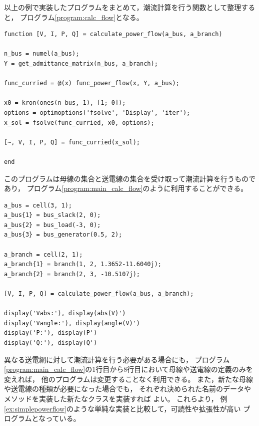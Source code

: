 \documentclass[tombow,dvipdfmx]{corona-a5-1.1}
\begin{document}
\begin{例}[潮流計算の実装結果]

以上の例で実装したプログラムをまとめて，潮流計算を行う関数として整理すると，
プログラム\nobreak\ref{program:calc_flow}となる。

\smallskip
\begin{PROGRAMA}[count,title={calculate\_power\_flow.m}]\label{program:calc_flow}
\begin{verbatim}
function [V, I, P, Q] = calculate_power_flow(a_bus, a_branch)

n_bus = numel(a_bus);
Y = get_admittance_matrix(n_bus, a_branch);

func_curried = @(x) func_power_flow(x, Y, a_bus);

x0 = kron(ones(n_bus, 1), [1; 0]);
options = optimoptions('fsolve', 'Display', 'iter');
x_sol = fsolve(func_curried, x0, options);

[~, V, I, P, Q] = func_curried(x_sol);

end
\end{verbatim}
\end{PROGRAMA}

このプログラムは母線の集合と送電線の集合を受け取って潮流計算を行うものであり，
プログラム\nobreak\ref{program:main_calc_flow}のように利用することができる。

\smallskip
\begin{PROGRAMA}[count,title={main\_power\_flow.m}]\label{program:main_calc_flow}
\begin{verbatim}
a_bus = cell(3, 1);
a_bus{1} = bus_slack(2, 0);
a_bus{2} = bus_load(-3, 0);
a_bus{3} = bus_generator(0.5, 2);

a_branch = cell(2, 1);
a_branch{1} = branch(1, 2, 1.3652-11.6040j);
a_branch{2} = branch(2, 3, -10.5107j);

[V, I, P, Q] = calculate_power_flow(a_bus, a_branch);

display('Vabs:'), display(abs(V)')
display('Vangle:'), display(angle(V)')
display('P:'), display(P')
display('Q:'), display(Q')
\end{verbatim}
\end{PROGRAMA}

異なる送電網に対して潮流計算を行う必要がある場合にも，
プログラム\nobreak\ref{program:main_calc_flow}の1行目から8行目において母線や送電線の定義のみを変えれば，
他のプログラムは変更することなく利用できる。
また，新たな母線や送電線の種類が必要になった場合でも，
それぞれ決められた名前のデータやメソッドを実装した新たなクラスを実装すれば
よい。
これらより，
例\ref{ex:simplepowerflow}のような単純な実装と比較して，可読性や拡張性が高い
プログラムとなっている。
\end{例}
\end{document}

